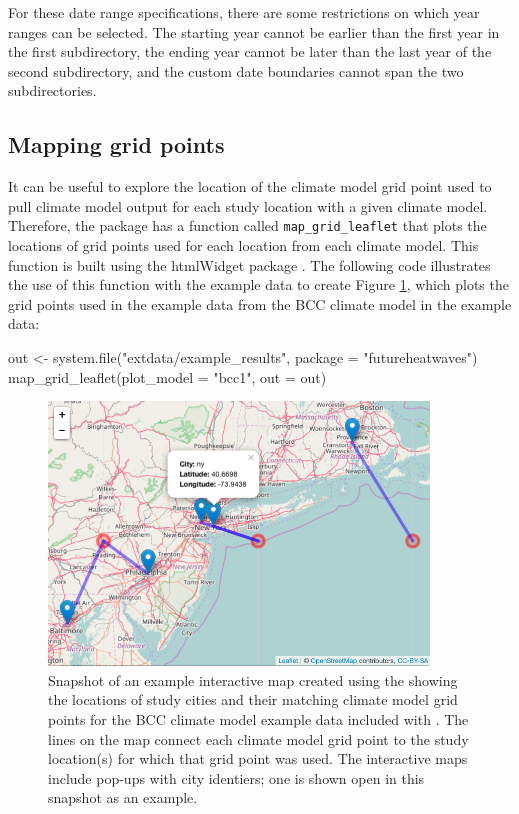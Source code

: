 For these date range specifications, there are some restrictions on
which year ranges can be selected. The starting year cannot be earlier
than the first year in the first subdirectory, the ending year cannot be
later than the last year of the second subdirectory, and the custom date
boundaries cannot span the two subdirectories.

\subsection{Mapping grid points}\label{mapping-grid-points}

It can be useful to explore the location of the climate model grid point
used to pull climate model output for each study location with a given
climate model. Therefore, the package has a function called
\texttt{map\_grid\_leaflet} that plots the locations of grid points used
for each location from each climate model. This function is built using
the htmlWidget  package \citep{leaflet}. The following code
illustrates the use of this function with the example data to create
Figure \ref{fig:gridmap}, which plots the grid points used in the
example data from the BCC climate model in the example data:

\begin{Schunk}
\begin{Sinput}
out <- system.file("extdata/example_results", package = "futureheatwaves")
map_grid_leaflet(plot_model = "bcc1", out = out)
\end{Sinput}
\end{Schunk}

\begin{figure}
\begin{center}
\includegraphics[width = 0.9\textwidth]{ExampleLeaflet}
\end{center}
\caption{Snapshot of an example interactive map created using the  showing the locations of study cities and their matching climate model grid points for the BCC climate model example data included with . The lines on the map connect each climate model grid point to the study location(s) for which that grid point was used. The interactive maps include pop-ups with city identiers; one is shown open in this snapshot as an example.}
\label{fig:gridmap}
\end{figure}

